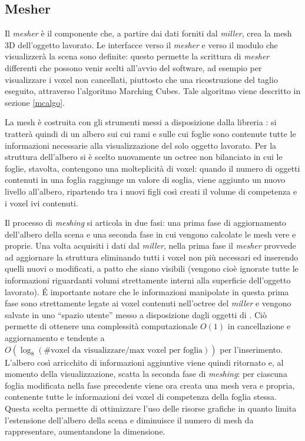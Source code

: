 \subsection{Mesher}
\label{sec:modules_mesher}
Il \emph{mesher} è il componente che, a partire dai dati forniti dal \emph{miller}, crea la mesh 3D dell'oggetto lavorato. Le interfacce verso il \emph{mesher} e verso il modulo che visualizzerà la scena sono definite: questo permette la scrittura di \emph{mesher} differenti che possono venir scelti all'avvio del software, ad esempio per visualizzare i voxel non cancellati, piuttosto che una ricostruzione del taglio eseguito, attraverso l'algoritmo Marching Cubes. Tale algoritmo viene descritto in sezione \ref{mcalgo}.

La mesh è costruita con gli strumenti messi a disposizione dalla libreria \osg: si tratterà quindi di un albero sui cui rami e sulle cui foglie sono contenute tutte le informazioni necessarie alla visualizzazione del solo oggetto lavorato. Per la struttura dell'albero si è scelto nuovamente un octree non bilanciato in cui le foglie, stavolta, contengono una molteplicità di voxel: quando il numero di oggetti contenuti in una foglia raggiunge un valore di soglia, viene aggiunto un nuovo livello all'albero, ripartendo tra i nuovi figli così creati il volume di competenza e i voxel ivi contenuti.

Il processo di \emph{meshing} si articola in due fasi: una prima fase di aggiornamento dell'albero della scena e una seconda fase in cui vengono calcolate le mesh vere e proprie. Una volta acquisiti i dati dal \emph{miller}, nella prima fase il \emph{mesher} provvede ad aggiornare la struttura eliminando tutti i voxel non più necessari ed inserendo quelli nuovi o modificati, a patto che siano visibili (vengono cioè ignorate tutte le informazioni riguardanti volumi strettamente interni alla superficie dell'oggetto lavorato). \'E importante notare che le informazioni manipolate in questa prima fase sono strettamente legate ai voxel contenuti nell'octree del \emph{miller} e vengono salvate in uno ``spazio utente'' messo a disposizione dagli oggetti di \osg. Ciò permette di ottenere una complessità computazionale $O(1)$ in cancellazione e aggiornamento e tendente a $O(\log_{8}(\text{\# voxel da visualizzare}/\text{max voxel per foglia}))$ per l'inserimento. L'albero così arricchito di informazioni aggiuntive viene quindi ritornato e, al momento della visualizzazione, scatta la seconda fase di \emph{meshing}: per ciascuna foglia modificata nella fase precedente viene ora creata una mesh vera e propria, contenente tutte le informazioni dei voxel di competenza della foglia stessa. Questa scelta permette di ottimizzare l'uso delle risorse grafiche in quanto limita l'estensione dell'albero della scena e diminuisce il numero di mesh da rappresentare, aumentandone la dimensione.

